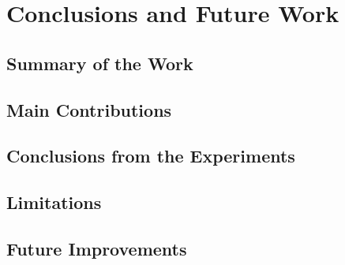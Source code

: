 \chapter{Conclusions and Future Work}

\section{Summary of the Work}

\section{Main Contributions}

\section{Conclusions from the Experiments}

\section{Limitations}

\section{Future Improvements}
